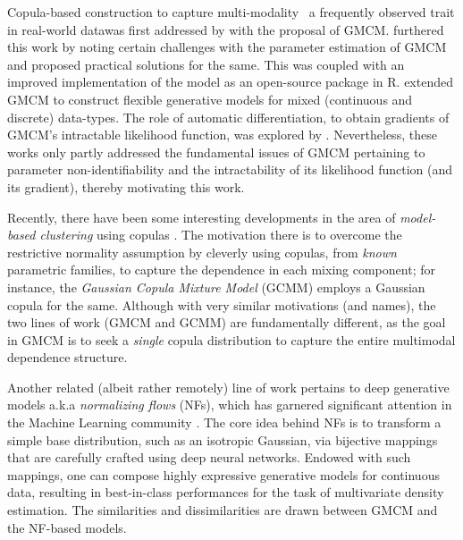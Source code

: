 \documentclass{article}
\theoremstyle{plain}
\theoremstyle{definition}
\theoremstyle{remark}
\begin{document}
Copula-based construction to capture multi-modality \textemdash \ a frequently observed trait in real-world data\textemdash was first addressed by \citet{Tewari2011} with the proposal of GMCM. \citet{Bilgrau2016} furthered this work by noting certain challenges with the parameter estimation of GMCM and proposed practical solutions for the same. This was coupled with an improved implementation of the model as an open-source package \citep{Bilgrau_Rpackage} in R. \citet{Rajan2016_GMCM_mixed_data} extended GMCM to construct flexible generative models for mixed (continuous and discrete) data-types. The role of automatic differentiation, to obtain gradients of GMCM's intractable likelihood function, was explored by \citet{Kasa2022}. Nevertheless, these works only partly addressed the fundamental issues of GMCM pertaining to parameter non-identifiability and the intractability of its likelihood function (and its gradient), thereby motivating this work.

Recently, there have been some interesting developments in the area of \emph{model-based clustering} using copulas \citep{Kosmidis2016,Mazo2017,Marbac2017,Rey2012_CopulaMixture}. The motivation there is to overcome the restrictive normality assumption by cleverly using copulas, from \emph{known} parametric families, to capture the dependence in each mixing component; for instance, the \emph{Gaussian Copula Mixture Model} (GCMM) \citep{Marbac2017} employs a Gaussian copula for the same. Although with very similar motivations (and names), the two lines of work (GMCM and GCMM) are fundamentally different, as the goal in GMCM is to seek a \emph{single} copula distribution to capture the entire multimodal dependence structure. 

Another related (albeit rather remotely) line of work pertains to deep generative models a.k.a \emph{normalizing flows} (NFs), which has garnered significant attention in the Machine Learning community \citep[see][for a comprehensive review on NFs]{Kobyzev2021}. The core idea behind NFs is to transform a simple base distribution, such as an isotropic Gaussian, via bijective mappings that are carefully crafted using deep neural networks. Endowed with such mappings, one can compose highly expressive generative models for continuous data, resulting in best-in-class performances for the task of multivariate density estimation. The similarities and dissimilarities are drawn between GMCM and the NF-based models.   
\end{document}
